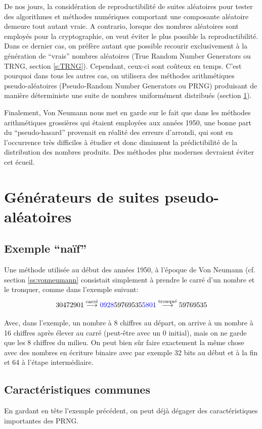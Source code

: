 \documentclass{scrartcl}
\begin{document}
De nos jours, la considération de reproductibilité de suites aléatoires pour
tester des algorithmes et méthodes numériques comportant une composante
aléatoire demeure tout autant vraie. A contrario, lorsque des nombres aléatoires
sont employés pour la cryptographie, on veut éviter le plus possible la
reproductibilité. Dans ce dernier cas, on préfère autant que possible recourir
exclusivement à la génération de ``vrais'' nombres aléatoires (True Random
Number Generators ou TRNG, section \ref{s:TRNG}). Cependant, ceux-ci sont
coûteux en temps. C'est pourquoi dans tous les autres cas, on utilisera des
méthodes arithmétiques pseudo-aléatoires (Pseudo-Random Number Generators ou
PRNG) produisant de manière déterministe une suite de nombres uniformément
distribués (section \ref{s:PRNG}).
\par\medskip

Finalement, Von Neumann nous met en garde sur le fait que dans les méthodes
arithmétiques grossières qui étaient employées aux années 1950, une bonne part
du ``pseudo-hasard'' provenait en réalité des erreurs d'arrondi, qui sont en
l'occurrence très difficiles à étudier et donc diminuent la prédictibilité de la
distribution des nombres produits. Des méthodes plus modernes devraient éviter
cet écueil.


\section{Générateurs de suites pseudo-aléatoires}\label{s:PRNG}

\subsection{Exemple ``naïf''}\label{ss:carres}
Une méthode utilisée au début des années 1950, à l'époque de Von Neumann
(cf. section \ref{ss:vonneumann} consistait simplement à prendre le carré d'un
nombre et le tronquer, comme dans l'exemple suivant:
\[
  30472901 \overset{\text{carré}}\longrightarrow {\color{blue}0928}59769535{\color{blue}5801}
  \overset{\text{tronqué}}\longrightarrow 59769535
\]

Avec, dans l'exemple, un nombre à 8 chiffres au départ, on arrive à un nombre à
16 chiffres après élever au carré (peut-être avec un 0 initial), mais on ne
garde que les 8 chiffres du milieu. On peut bien sûr faire exactement la même
chose avec des nombres en écriture binaire avec par exemple 32 bits au début et
à la fin et 64 à l'étape intermédiaire.

\subsection{Caractéristiques communes}
En gardant en tête l'exemple précédent, on peut déjà dégager des
caractéristiques importantes des PRNG.
\end{document}
